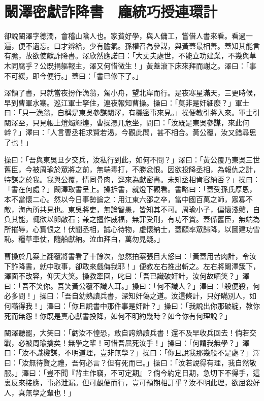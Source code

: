 
\chapter{闞澤密獻詐降書　龐統巧授連環計}

卻說闞澤字德潤，會稽山陰人也。家貧好學，與人傭工，嘗借人書來看。看過一遍，便不遺忘。口才辨給，少有膽氣。孫權召為參謀，與黃蓋最相善。蓋知其能言有膽，故欲使獻詐降書。澤欣然應諾曰：「大丈夫處世，不能立功建業，不幾與草木同腐乎？公既捐軀報主，澤又何惜微生！」黃蓋滾下床來拜而謝之。澤曰：「事不可緩，即今便行。」蓋曰：「書已修下了。」

澤領了書，只就當夜扮作漁翁，駕小舟，望北岸而行。是夜寒星滿天，三更時候，早到曹軍水寨。巡江軍士拏住，連夜報知曹操。操曰：「莫非是奸細麼？」軍士曰：「只一漁翁，自稱是東吳參謀闞澤，有機密事來見。」操便教引將入來。軍士引闞澤至，只見帳上燈燭輝煌，曹操憑几危坐，問曰：「汝既是東吳參謀，來此何幹？」澤曰：「人言曹丞相求賢若渴，今觀此問，甚不相合。黃公覆，汝又錯尋思了也！」

操曰：「吾與東吳旦夕交兵，汝私行到此，如何不問？」澤曰：「黃公覆乃東吳三世舊臣，今被周瑜於眾將之前，無端毒打，不勝忿恨。因欲投降丞相，為報仇之計，特謀之於我。我與公覆，情同骨肉，逕來為獻密書。未知丞相肯容納否？」操曰：「書在何處？」闞澤取書呈上。操拆書，就燈下觀看。書略曰：「蓋受孫氏厚恩，本不當懷二心。然以今日事勢論之：用江東六邵之卒，當中國百萬之師，眾寡不敵，海內所共見也。東吳將吏，無論智愚，皆知其不可。周瑜小子，偏懷淺戇，自負其能，輒欲以卵敵石；兼之擅作威福，無罪受刑，有功不賞。蓋係舊臣，無端為所摧辱，心實恨之！伏聞丞相，誠心待物，虛懷納士，蓋願率眾歸降，以圖建功雪恥。糧草車仗，隨船獻納。泣血拜白，萬勿見疑。」

曹操於几案上翻覆將書看了十餘次，忽然拍案張目大怒曰：「黃蓋用苦肉計，令汝下詐降書，就中取事，卻敢來戲侮我耶！」便教左右推出斬之。左右將闞澤簇下，澤面不改容，仰天大笑。操教牽回，叱曰：「吾已識破奸計，汝何故哂笑？」澤曰：「吾不笑你。吾笑黃公覆不識人耳。」操曰：「何不識人？」澤曰：「殺便殺，何必多問！」操曰：「吾自幼熟讀兵書，深知奸偽之道。汝這條計，只好瞞別人，如何瞞得我！」澤曰：「你且說書中那件事是奸計？」操曰：「我說出你那破綻，教你死而無怨！你既是真心獻書投降，如何不明約幾時？如今你有何理說？」

闞澤聽罷，大笑曰：「虧汝不惶恐，敢自誇熟讀兵書！還不及早收兵回去！倘若交戰，必被周瑜擒矣！無學之輩！可惜吾屈死汝手！」操曰：「何謂我無學？」澤曰：「汝不識機謀，不明道理，豈非無學？」操曰：「你且說我那幾般不是處？」澤曰：「汝無待賢之禮，吾何必言？但有死而已。」操曰：「汝若說得有理，我自然敬服。」澤曰：「豈不聞『背主作竊，不可定期』？倘今約定日期，急切下不得手，這裏反來接應，事必泄漏。但可覷便而行，豈可預期相訂乎？汝不明此理，欲屈殺好人，真無學之輩也！」


